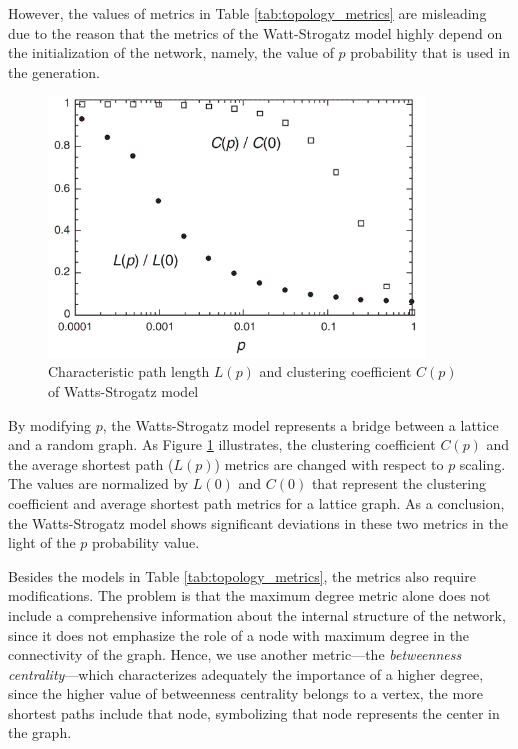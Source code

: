 However, the values of metrics in Table \ref{tab:topology_metrics} are misleading due to the reason that the metrics of the Watt-Strogatz model highly depend on the initialization of the network, namely, the value of $p$ probability that is used in the generation.

\begin{figure}[!ht]
	\centering
	\includegraphics[width=100mm, keepaspectratio]{figures/ws_metrics.png}
	\caption{Characteristic path length $L(p)$ and clustering coefficient $C(p)$ of Watts-Strogatz model~\cite{ws_metrics}}
	\label{fig:ws}
\end{figure}

By modifying $p$, the Watts-Strogatz model represents a bridge between a lattice and a random graph. As Figure \ref{fig:ws} illustrates, the clustering coefficient $C(p)$ and the average shortest path ($L(p)$) metrics are changed with respect to $p$ scaling. The values are normalized by $L(0)$ and $C(0)$ that represent the clustering coefficient and average shortest path metrics for a lattice graph. As a conclusion, the Watts-Strogatz model shows significant deviations in these two metrics in the light of the $p$ probability value. 

Besides the models in Table \ref{tab:topology_metrics}, the metrics also require modifications. The problem is that the maximum degree metric alone does not include a comprehensive information about the internal structure of the network, since it does not emphasize the role of a node with maximum degree in the connectivity of the graph. Hence, we use another metric---the \textit{betweenness centrality}---which characterizes adequately the importance of a higher degree, since the higher value of betweenness centrality belongs to a vertex, the more shortest paths include that node, symbolizing that node represents the center in the graph.

